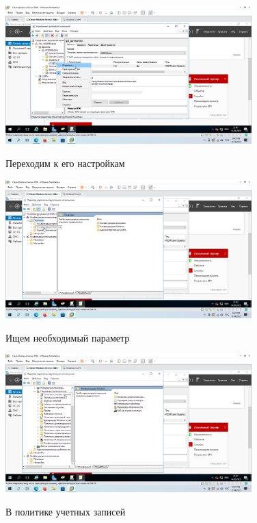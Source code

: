 \documentclass[a4paper]{article}
\begin{document}
  \begin{figure}[H]
    \centering
    \includegraphics[width=0.85\textwidth]{5_0113}
    \label{img:113}
    \caption{Переходим к его настройкам}
  \end{figure}

  \begin{figure}[H]
    \centering
    \includegraphics[width=0.85\textwidth]{5_0114}
    \label{img:114}
    \caption{Ищем необходимый параметр}
  \end{figure}

  \begin{figure}[H]
    \centering
    \includegraphics[width=0.85\textwidth]{5_0115}
    \label{img:115}
    \caption{В политике учетных записей}
  \end{figure}
\end{document}
